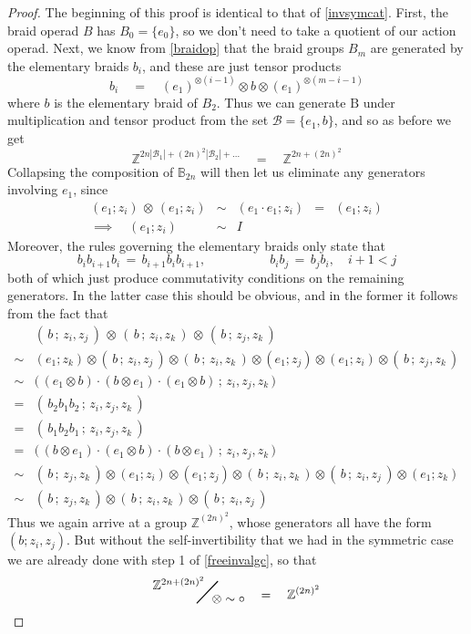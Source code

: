 \documentclass{amsbook} %
\newcommand{\bigquotient}[2]{ \raisebox{0.75\height}{$#1$} \mkern-12mu\scalebox{2}{$\diagup$}\mkern-10mu \raisebox{-0.5\height}{$#2$} }
\numberwithin{section}{chapter}
\begin{document}
\begin{proof}
The beginning of this proof is identical to that of \cref{invsymcat}. First, the braid operad $B$ has $B_0 = \{e_0\}$, so we don't need to take a quotient of our action operad. Next, we know from \cref{braidop} that the braid groups $B_m$ are generated by the elementary braids $b_i$, and these are just tensor products
\[ b_i \quad = \quad (e_1)^{\otimes (i-1)} \otimes b \otimes (e_1)^{\otimes (m-i-1)} \]
where $b$ is the elementary braid of $B_2$. Thus we can generate $\mathrm{B}$ under multiplication and tensor product from the set $\mathcal{B} = \{ e_1, b \}$, and so as before we get
\[ \mathbb{Z}^{2n|\mathcal{B}_1| + (2n)^2|\mathcal{B}_2| + ...}  \quad = \quad \mathbb{Z}^{2n + (2n)^2} \]
Collapsing the composition of $\mathbb{B}_{2n}$ will then let us eliminate any generators involving $e_1$, since
\[ \begin{array}{rllll}
			(e_1; z_i) \, \otimes \, (e_1; z_i) & \sim & (e_1 \cdot e_1; z_i) & = & (e_1; z_i) \\
			\implies \quad (e_1; z_i) & \sim & I
		\end{array}
\]
Moreover, the rules governing the elementary braids only state that
\[ b_i b_{i+1} b_i \, = \, b_{i+1} b_i b_{i+1}, \quad \quad \quad \quad \quad b_i b_j \, = \, b_j b_i, \quad i+1 < j \]
both of which just produce commutativity conditions on the remaining generators. In the latter case this should be obvious, and in the former it follows from the fact that
\[ \begin{array}{rl}
			& ( \, b \, ; \, z_i, z_j \, ) \, \otimes \, ( \, b \, ; \, z_i, z_k \, ) \, \otimes \, ( \, b \, ; \, z_j, z_k \, ) \\
			\sim & (e_1; z_k) \otimes ( \, b \, ; \, z_i, z_j \, ) \otimes ( \, b \, ; \, z_i, z_k \, ) \otimes (e_1; z_j) \otimes (e_1; z_i) \otimes ( \, b \, ; \, z_j, z_k \, )\\
			\sim & \big( \, (e_1 \otimes b) \cdot (b \otimes e_1) \cdot (e_1 \otimes b) \, ; \, z_i, z_j, z_k \, \big) \\	
			= & ( \, b_2 b_1 b_2 \, ; \, z_i, z_j, z_k \, ) \\
			= & ( \, b_1 b_2 b_1 \, ; \, z_i, z_j, z_k \, ) \\
			= & \big( \, (b \otimes e_1) \cdot (e_1 \otimes b) \cdot (b \otimes e_1) \, ; \, z_i, z_j, z_k \, \big) \\
			\sim & ( \, b\, ; \, z_j, z_k \, ) \otimes (e_1; z_i) \otimes (e_1; z_j) \otimes ( \, b \, ; \, z_i, z_k \, ) \otimes ( \, b \, ; \, z_i, z_j \, ) \otimes (e_1; z_k) \\
			\sim & ( \, b \, ; \, z_j, z_k \, ) \otimes ( \, b \, ; \, z_i, z_k \, ) \otimes ( \, b \, ; \, z_i, z_j \, )
		\end{array}
\]
Thus we again arrive at a group $\mathbb{Z}^{(2n)^2}$, whose generators all have the form $(b; z_i, z_j)$. But without the self-invertibility that we had in the symmetric case we are already done with step 1 of \cref{freeinvalgc}, so that
\[ \bigquotient{\mathbb{Z}^{2n + (2n)^2}}{\otimes \sim \circ} \quad = \quad \mathbb{Z}^{(2n)^2} \]


\end{proof}
\end{document}
